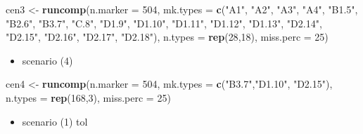 \documentclass[]{article}
\newenvironment{Shaded}{\begin{snugshade}}{\end{snugshade}}
\newcommand{\DataTypeTok}[1]{\textcolor[rgb]{0.13,0.29,0.53}{#1}}
\newcommand{\DecValTok}[1]{\textcolor[rgb]{0.00,0.00,0.81}{#1}}
\newcommand{\KeywordTok}[1]{\textcolor[rgb]{0.13,0.29,0.53}{\textbf{#1}}}
\newcommand{\NormalTok}[1]{#1}
\newcommand{\StringTok}[1]{\textcolor[rgb]{0.31,0.60,0.02}{#1}}
\providecommand{\tightlist}{%
  \setlength{\itemsep}{0pt}\setlength{\parskip}{0pt}}
\begin{document}
\begin{Shaded}
\begin{Highlighting}[]
\NormalTok{cen3 <-}\StringTok{ }\KeywordTok{runcomp}\NormalTok{(}\DataTypeTok{n.marker =} \DecValTok{504}\NormalTok{, }
                \DataTypeTok{mk.types =} \KeywordTok{c}\NormalTok{(}\StringTok{"A1"}\NormalTok{, }\StringTok{"A2"}\NormalTok{, }\StringTok{"A3"}\NormalTok{, }\StringTok{"A4"}\NormalTok{, }\StringTok{"B1.5"}\NormalTok{, }\StringTok{"B2.6"}\NormalTok{, }\StringTok{"B3.7"}\NormalTok{,}
                             \StringTok{"C.8"}\NormalTok{, }\StringTok{"D1.9"}\NormalTok{, }\StringTok{"D1.10"}\NormalTok{, }\StringTok{"D1.11"}\NormalTok{, }\StringTok{"D1.12"}\NormalTok{, }\StringTok{"D1.13"}\NormalTok{,}
                             \StringTok{"D2.14"}\NormalTok{, }\StringTok{"D2.15"}\NormalTok{, }\StringTok{"D2.16"}\NormalTok{, }\StringTok{"D2.17"}\NormalTok{, }\StringTok{"D2.18"}\NormalTok{),}
                \DataTypeTok{n.types =} \KeywordTok{rep}\NormalTok{(}\DecValTok{28}\NormalTok{,}\DecValTok{18}\NormalTok{),}
                \DataTypeTok{miss.perc =} \DecValTok{25}\NormalTok{)}
\end{Highlighting}
\end{Shaded}

\begin{itemize}
\tightlist
\item
  scenario (4)
\end{itemize}

\begin{Shaded}
\begin{Highlighting}[]
\NormalTok{cen4 <-}\StringTok{ }\KeywordTok{runcomp}\NormalTok{(}\DataTypeTok{n.marker =} \DecValTok{504}\NormalTok{, }
                \DataTypeTok{mk.types =} \KeywordTok{c}\NormalTok{(}\StringTok{"B3.7"}\NormalTok{,}\StringTok{"D1.10"}\NormalTok{, }\StringTok{"D2.15"}\NormalTok{),}
                \DataTypeTok{n.types =} \KeywordTok{rep}\NormalTok{(}\DecValTok{168}\NormalTok{,}\DecValTok{3}\NormalTok{),}
                \DataTypeTok{miss.perc =} \DecValTok{25}\NormalTok{)}
\end{Highlighting}
\end{Shaded}

\begin{itemize}
\tightlist
\item
  scenario (1) tol
\end{itemize}
\end{document}

